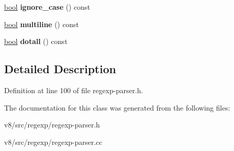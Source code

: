 \begin{DoxyCompactItemize}
\item 
\mbox{\label{classv8_1_1internal_1_1RegExpBuilder_a3f803f9e2bb007b105f92c3ca28c957f}} 
\mbox{\hyperlink{classbool}{bool}} {\bfseries ignore\+\_\+case} () const
\item 
\mbox{\label{classv8_1_1internal_1_1RegExpBuilder_a14ad08ed9556e0a1171b9b4ea7deb2f2}} 
\mbox{\hyperlink{classbool}{bool}} {\bfseries multiline} () const
\item 
\mbox{\label{classv8_1_1internal_1_1RegExpBuilder_a84b5f1b1efcafe29f00eb160d0c6e6fb}} 
\mbox{\hyperlink{classbool}{bool}} {\bfseries dotall} () const
\end{DoxyCompactItemize}


\subsection{Detailed Description}


Definition at line 100 of file regexp-\/parser.\+h.



The documentation for this class was generated from the following files\+:\begin{DoxyCompactItemize}
\item 
v8/src/regexp/regexp-\/parser.\+h\item 
v8/src/regexp/regexp-\/parser.\+cc\end{DoxyCompactItemize}

